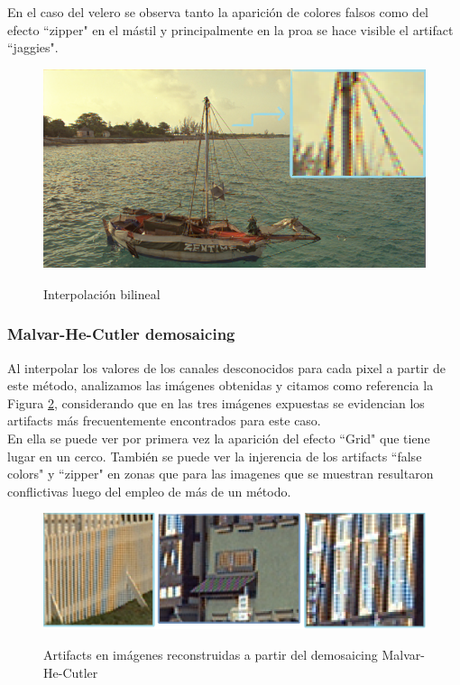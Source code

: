 \documentclass[a4paper]{article}
\begin{document}
En el caso del velero se observa tanto la aparición de colores falsos como del efecto ``zipper" en el mástil y principalmente en la proa se hace visible el artifact ``jaggies".

\begin{figure}[h!]
	\caption{Interpolación bilineal}
	\begin{center}
	\includegraphics[scale=0.06]{imagenes/barcobilineal}
	\label{barcobilineal}
  \end{center}
\end{figure}

\subsubsection{Malvar-He-Cutler demosaicing}

Al interpolar los valores de los canales desconocidos para cada pixel a partir de este método, analizamos las imágenes obtenidas y citamos como referencia la Figura \ref{mhczoom}, considerando que en las tres imágenes expuestas se evidencian los artifacts más frecuentemente encontrados para este caso.\\
En ella se puede ver por primera vez la aparición del efecto ``Grid" que tiene lugar en un cerco. También se puede ver la injerencia de los artifacts ``false colors" y ``zipper" en zonas que para las imagenes que se muestran resultaron conflictivas luego del empleo de más de un método.


\begin{figure}[h!]
	\caption{Artifacts en imágenes reconstruidas a partir del demosaicing Malvar-He-Cutler}
	\begin{center}
	\includegraphics[scale=0.7]{imagenes/mhczoom}
	\label{mhczoom}
  \end{center}
\end{figure}
\end{document}
